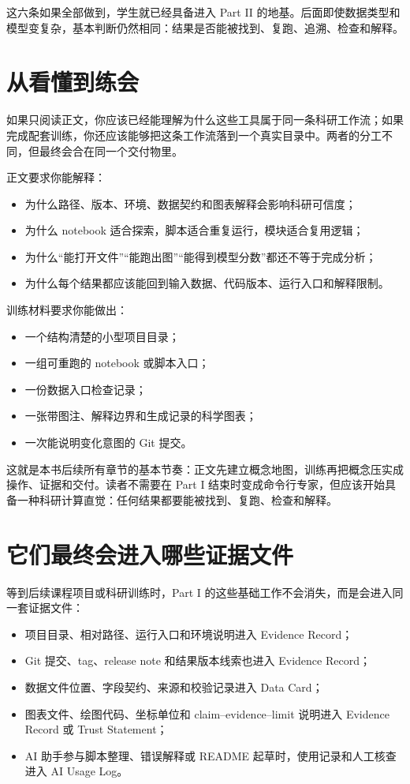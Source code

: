 这六条如果全部做到，学生就已经具备进入 Part II 的地基。后面即使数据类型和模型变复杂，基本判断仍然相同：结果是否能被找到、复跑、追溯、检查和解释。

\section*{从看懂到练会}

如果只阅读正文，你应该已经能理解为什么这些工具属于同一条科研工作流；如果完成配套训练，你还应该能够把这条工作流落到一个真实目录中。两者的分工不同，但最终会合在同一个交付物里。

正文要求你能解释：

\begin{itemize}
    \item 为什么路径、版本、环境、数据契约和图表解释会影响科研可信度；
    \item 为什么 notebook 适合探索，脚本适合重复运行，模块适合复用逻辑；
    \item 为什么“能打开文件”“能跑出图”“能得到模型分数”都还不等于完成分析；
    \item 为什么每个结果都应该能回到输入数据、代码版本、运行入口和解释限制。
\end{itemize}

训练材料要求你能做出：

\begin{itemize}
    \item 一个结构清楚的小型项目目录；
    \item 一组可重跑的 notebook 或脚本入口；
    \item 一份数据入口检查记录；
    \item 一张带图注、解释边界和生成记录的科学图表；
    \item 一次能说明变化意图的 Git 提交。
\end{itemize}

这就是本书后续所有章节的基本节奏：正文先建立概念地图，训练再把概念压实成操作、证据和交付。读者不需要在 Part I 结束时变成命令行专家，但应该开始具备一种科研计算直觉：任何结果都要能被找到、复跑、检查和解释。

\section*{它们最终会进入哪些证据文件}

等到后续课程项目或科研训练时，Part I 的这些基础工作不会消失，而是会进入同一套证据文件：

\begin{itemize}
    \item 项目目录、相对路径、运行入口和环境说明进入 Evidence Record；
    \item Git 提交、tag、release note 和结果版本线索也进入 Evidence Record；
    \item 数据文件位置、字段契约、来源和校验记录进入 Data Card；
    \item 图表文件、绘图代码、坐标单位和 claim--evidence--limit 说明进入 Evidence Record 或 Trust Statement；
    \item AI 助手参与脚本整理、错误解释或 README 起草时，使用记录和人工核查进入 AI Usage Log。
\end{itemize}

